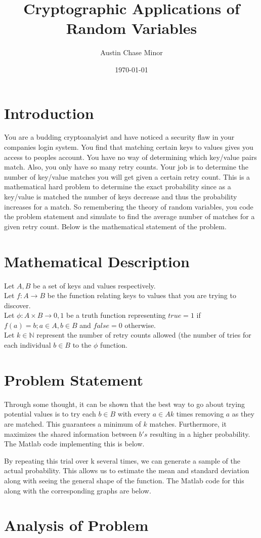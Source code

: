 \documentclass{article}
\author{Austin Chase Minor}
\title{Cryptographic Applications of Random Variables}
\date{\today}
\begin{document}
   \maketitle

   \section{Introduction}
   You are a budding cryptoanalyist and have noticed a security
   flaw in your companies login system. You find that matching
   certain keys to values gives you access to peoples account.
   You have no way of determining which key/value pairs match.
   Also, you only have so many retry counts. 
   Your job is to determine the number of key/value matches you
   will get given a certain retry count. This is a mathematical
   hard problem to determine the exact probability since
   as a key/value is matched the number of keys decrease and thus
   the probability increases for a match. So remembering the theory
   of random variables, you code the problem statement and simulate
   to find the average number of matches for a given retry count.
   Below is the mathematical statement of the problem.

   \section{Mathematical Description}
   \begin{flushleft}
      Let $A, B$ be a set of keys and values respectively.\\
      Let $f: A \to B$ be the function relating
      keys to values that you are trying to discover.\\
      Let $\phi: A \times B \to {0,1}$ be a truth
      function representing $true = 1$ if $f(a) = b; a \in A, b \in B$
      and $false = 0$ otherwise.\\
      Let $k \in \mathbb{N}$ represent the
      number of retry counts allowed (the number of tries for each individual
      $b \in B$ to the $\phi$ function.\\
   \end{flushleft}

   \section{Problem Statement}
      Through some thought, it can be shown that the best way to go
      about trying potential values is to try each $b \in B$ with
      every $a \in A k$ times removing $a$ as they are matched. This
      guarantees a minimum of $k$ matches. Furthermore, it maximizes the
      shared information between $b's$ resulting in a higher probability.
      The Matlab code implementing this is below.

      By repeating this trial over k several times, we can generate
      a sample of the actual probability. This allows us to estimate
      the mean and standard deviation along with seeing the general
      shape of the function. The Matlab code for this along with
      the corresponding graphs are below.
   \section{Analysis of Problem}
\end{document}
